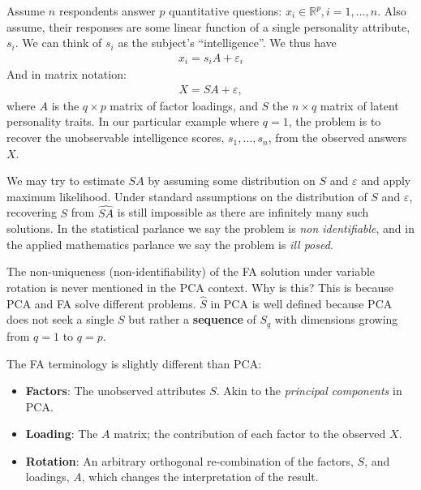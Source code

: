 \documentclass[]{book}
\theoremstyle{definition}
\theoremstyle{definition}
\theoremstyle{definition}
\theoremstyle{remark}
\let\BeginKnitrBlock\begin \let\EndKnitrBlock\end
\begin{document}
\BeginKnitrBlock{example}
\protect\hypertarget{exm:unnamed-chunk-250}{}{\label{exm:unnamed-chunk-250} }Assume \(n\) respondents answer \(p\) quantitative questions: \(x_i \in \mathbb{R}^p, i=1,\dots,n\).
Also assume, their responses are some linear function of a single personality attribute, \(s_i\).
We can think of \(s_i\) as the subject's ``intelligence''.
We thus have
\begin{align}
    x_i = s_i A  + \varepsilon_i
\end{align}
And in matrix notation:
\begin{align}
    X = S A+\varepsilon,
    \label{eq:factor}
\end{align}
where \(A\) is the \(q \times p\) matrix of factor loadings, and \(S\) the \(n \times q\) matrix of latent personality traits.
In our particular example where \(q=1\), the problem is to recover the unobservable intelligence scores, \(s_1,\dots,s_n\), from the observed answers \(X\).
\EndKnitrBlock{example}

We may try to estimate \(S A\) by assuming some distribution on \(S\) and \(\varepsilon\) and apply maximum likelihood.
Under standard assumptions on the distribution of \(S\) and \(\varepsilon\), recovering \(S\) from \(\widehat{S A }\) is still impossible as there are infinitely many such solutions.
In the statistical parlance we say the problem is \emph{non identifiable}, and in the applied mathematics parlance we say the problem is \emph{ill posed}.

\BeginKnitrBlock{remark}
{}The non-uniqueness (non-identifiability) of the FA solution under variable rotation is never mentioned in the PCA context.
Why is this?
This is because PCA and FA solve different problems.
\(\hat S\) in PCA is well defined because PCA does not seek a single \(S\) but rather a \textbf{sequence} of \(S_q\) with dimensions growing from \(q=1\) to \(q=p\).
\EndKnitrBlock{remark}

The FA terminology is slightly different than PCA:

\begin{itemize}
\item
  \textbf{Factors}:
  The unobserved attributes \(S\).
  Akin to the \emph{principal components} in PCA.
\item
  \textbf{Loading}:
  The \(A\) matrix; the contribution of each factor to the observed \(X\).
\item
  \textbf{Rotation}:
  An arbitrary orthogonal re-combination of the factors, \(S\), and loadings, \(A\), which changes the interpretation of the result.
\end{itemize}
\end{document}
